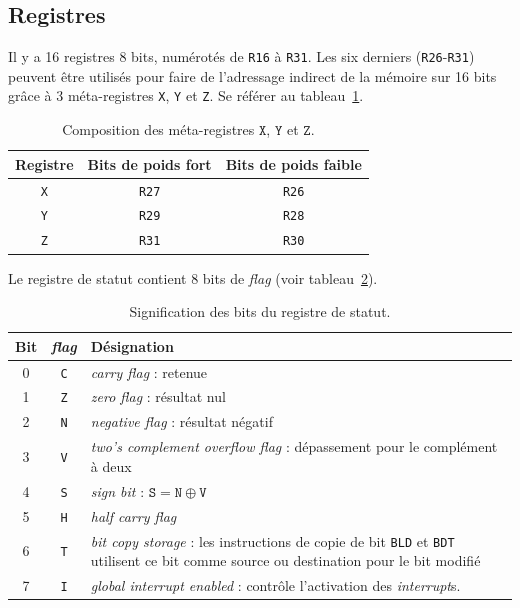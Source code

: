 \documentclass[11pt]{article}
\begin{document}
\subsection{Registres}\label{sec:registres}
Il y a 16 registres 8 bits, numérotés de \verb|R16| à \verb|R31|. Les
six derniers (\verb|R26|-\verb|R31|) peuvent être utilisés pour faire
de l'adressage indirect de la mémoire sur 16 bits grâce à 3 méta-registres \verb|X|, \verb|Y|
et \verb|Z|. Se référer au tableau~\ref{tab:méta-registres}.
\begin{table}[htbp]
  \centering
  \begin{tabular}{|c|c|c|}
\hline
    Registre & Bits de poids fort & Bits de poids faible \\
\hline
\hline
    \verb|X| & \verb|R27| & \verb|R26| \\
\hline
    \verb|Y| & \verb|R29| & \verb|R28| \\
\hline
    \verb|Z| & \verb|R31| & \verb|R30| \\
\hline
  \end{tabular}
  \caption{\label{tab:méta-registres}Composition des méta-registres
    $\texttt{X}$, $\texttt{Y}$ et $\texttt{Z}$.}

\end{table}

Le registre de statut contient 8 bits de \emph{flag} (voir
tableau~\ref{tab:status_register}).
\begin{table}[h!tbp]
  \centering
  \begin{tabular}{c c m{30em}}
    Bit & \emph{flag} & Désignation \\
\hline
    0 & \texttt{C} & \emph{carry flag} : retenue \\
    1 & \texttt{Z} & \emph{zero flag} : résultat nul \\
    2 & \texttt{N} & \emph{negative flag} : résultat négatif \\
    3 & \texttt{V} & \emph{two's complement overflow flag} : dépassement pour
            le complément à deux \\
    4 & \texttt{S} & \emph{sign bit} : $\mathtt{S} = \mathtt{N} \oplus
            \mathtt{V}$ \\
    5 & \texttt{H} & \emph{half carry flag} \\
    6 & \texttt{T} & \emph{bit copy storage} : les instructions de copie de bit
            \texttt{BLD} et \texttt{BDT} utilisent ce bit comme source
            ou destination pour le bit modifié \\
    7 & \texttt{I} & \emph{global interrupt enabled} : contrôle l'activation
            des \emph{interrupt}s.
  \end{tabular}
  \caption{\label{tab:status_register}Signification des bits du registre de statut.}
\end{table}
\end{document}
